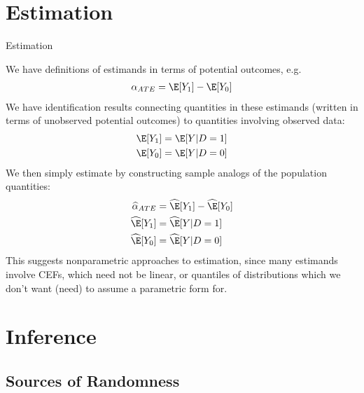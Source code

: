 \documentclass[aspectratio=169, handout]{beamer}
\begin{document}
\section{Estimation}

{\footnotesize
\begin{frame}{Estimation}

We have definitions of estimands in terms of potential outcomes, e.g.
\begin{align*}
  \alpha_{ATE} = \E[Y_1]-\E[Y_0]
\end{align*}
We have identification results connecting quantities in these estimands
(written in terms of unobserved potential outcomes) to quantities
involving observed data:
\begin{align*}
  \E[Y_1] &= \E[Y|D=1] \\
  \E[Y_0] &= \E[Y|D=0]
\end{align*}
We then simply estimate by constructing sample analogs of the population
quantities:
\begin{align*}
  \widehat{\alpha}_{ATE}
  &= \widehat{\E}[Y_1]-\widehat{\E}[Y_0]
  \\
  \widehat{\E}[Y_1] &= \widehat{\E}[Y|D=1] \\
  \widehat{\E}[Y_0] &= \widehat{\E}[Y|D=0]
\end{align*}
This suggests nonparametric approaches to estimation, since many
estimands involve CEFs, which need not be linear, or quantiles of
distributions which we don't want (need) to assume a parametric form
for.
\end{frame}
}



\section{Inference}


\subsection{Sources of Randomness}

\end{document}
